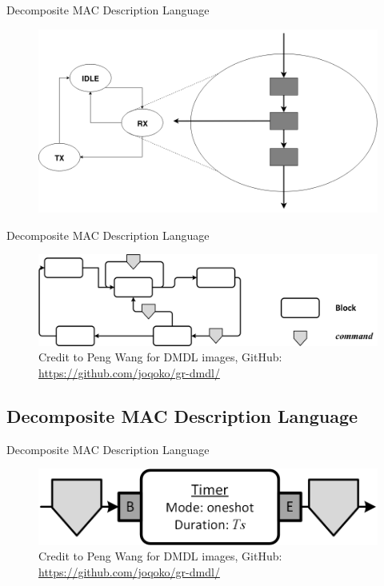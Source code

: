 \documentclass{beamer}
\begin{document}
\begin{frame}{Decomposite MAC Description Language}
	\begin{figure}
 		\includegraphics[width=\linewidth]{hfsm.png}
 		\label{fig:hfsm}
	\end{figure}
\end{frame}

\begin{frame}{Decomposite MAC Description Language}
	\begin{figure}
 		\includegraphics[width=\linewidth]{graph.png}
 		\label{fig:graph}
        \vfill
        \vfill
        \center
        \begingroup
            \fontsize{3pt}{3pt}\selectfont
            \center
            Credit to Peng Wang for DMDL images, GitHub: \url{https://github.com/joqoko/gr-dmdl/}
        \endgroup
	\end{figure}
\end{frame}

\subsection{Decomposite MAC Description Language}
\begin{frame}{Decomposite MAC Description Language}
	\begin{figure}
 		\includegraphics[width=\linewidth]{simple_timer.png}
 		\label{fig:timer}
        \vfill
        \vfill
        \vfill
        \vfill
        \center
        \begingroup
            \fontsize{3pt}{3pt}\selectfont
            \center
            Credit to Peng Wang for DMDL images, GitHub: \url{https://github.com/joqoko/gr-dmdl/}
        \endgroup
	\end{figure}
\end{frame}
\end{document}
